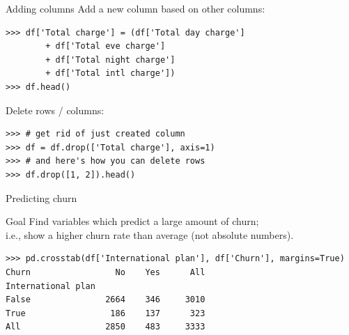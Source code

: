 \documentclass[aspectratio=169,usenames,dvipsnames]{beamer}
\begin{document}
\begin{frame}[fragile]{Adding columns}
Add a new column based on other columns:
\begin{lstlisting}
>>> df['Total charge'] = (df['Total day charge']
        + df['Total eve charge']
        + df['Total night charge']
        + df['Total intl charge'])
>>> df.head()
\end{lstlisting}

Delete rows / columns:

\begin{lstlisting}
>>> # get rid of just created column
>>> df = df.drop(['Total charge'], axis=1)
>>> # and here's how you can delete rows
>>> df.drop([1, 2]).head()
\end{lstlisting}
\end{frame}

\begin{frame}[fragile]{Predicting churn}
\begin{block}{Goal}
    Find variables which predict a large amount of churn;\\
    i.e., show a higher churn rate than average (not absolute numbers).
\end{block}

\begin{lstlisting}
>>> pd.crosstab(df['International plan'], df['Churn'], margins=True)
Churn                 No    Yes      All
International plan
False               2664    346     3010
True                 186    137      323
All                 2850    483     3333
\end{lstlisting}
\end{frame}
\end{document}
